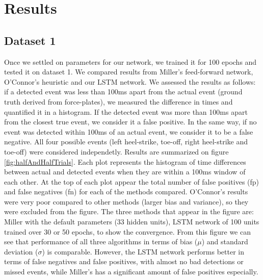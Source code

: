 \documentclass{acm_proc_article-sp}
\begin{document}
\section{Results}
\label{sec:Results}

\subsection{Dataset 1}
Once we settled on parameters for our network, we trained it for 100 epochs and tested it on dataset 1. We compared results from Miller's feed-forward network, O'Connor's heuristic and our LSTM network. We assessed the results as follows: if a detected event was less than 100ms apart from the actual event (ground truth derived from force-plates), we measured the difference in times and quantified it in a histogram. If the detected event was more than 100ms apart from the closest true event, we consider it a false positive. In the same way, if no event was detected within 100ms of an actual event, we consider it to be a false negative. All four possible events (left heel-strike, toe-off, right heel-strike and toe-off) were considered independetly.  Results are summarized on figure \ref{fig:halfAndHalfTrials}. Each plot represents the histogram of time differences between actual and detected events when they are within a 100ms window of each other. At the top of each plot appear the total number of false positives (fp) and false negatives (fn) for each of the methods compared. O'Connor's results were very poor compared to other methods (larger bias and variance), so they were excluded from the figure. The three methods that appear in the figure are: Miller with the default parameters (33 hidden units), LSTM network of 100 units trained over 30 or 50 epochs, to show the convergence. From this figure we can see that performance of all three algorithms in terms of bias ($\mu$) and standard deviation ($\sigma$) is comparable. However, the LSTM network performs better in terms of false negatives and false positives, with almost no bad detections or missed events, while Miller's has a significant amount of false positives especially.\\
\end{document}
